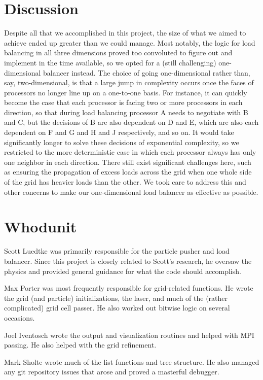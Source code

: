\documentclass[]{article}
\begin{document}
\section{Discussion}
Despite all that we accomplished in this project, the size of what we aimed to achieve ended up greater than we could manage. Most notably, the logic for load balancing in all three dimensions proved too convoluted to figure out and implement in the time available, so we opted for a (still challenging) one-dimensional balancer instead. The choice of going one-dimensional rather than, say, two-dimensional, is that a large jump in complexity occurs once the faces of processors no longer line up on a one-to-one basis. For instance, it can quickly become the case that each processor is facing two or more processors in each direction, so that during load balancing processor A needs to negotiate with B and C, but the decisions of B are also dependent on D and E, which are also each dependent on F and G and H and J respectively, and so on. It would take significantly longer to solve these decisions of exponential complexity, so we restricted to the more deterministic case in which each processor always has only one neighbor in each direction. There still exist significant challenges here, such as ensuring the propagation of excess loads across the grid when one whole side of the grid has heavier loads than the other. We took care to address this and other concerns to make our one-dimensional load balancer as effective as possible.

\section{Whodunit}
Scott Luedtke was primarily responsible for the particle pusher and load balancer.  Since this project is closely related to Scott's research, he oversaw the physics and provided general guidance for what the code should accomplish.

Max Porter was most frequently responsible for grid-related functions. He wrote the grid (and particle) initializations, the laser, and much of the (rather complicated) grid cell passer. He also worked out bitwise logic on several occasions.

Joel Iventosch wrote the output and visualization routines and helped with MPI passing.  He also helped with the grid refinement.

Mark Sholte wrote much of the list functions and tree structure.  He also managed any git repository issues that arose and proved a masterful debugger.
\end{document}
